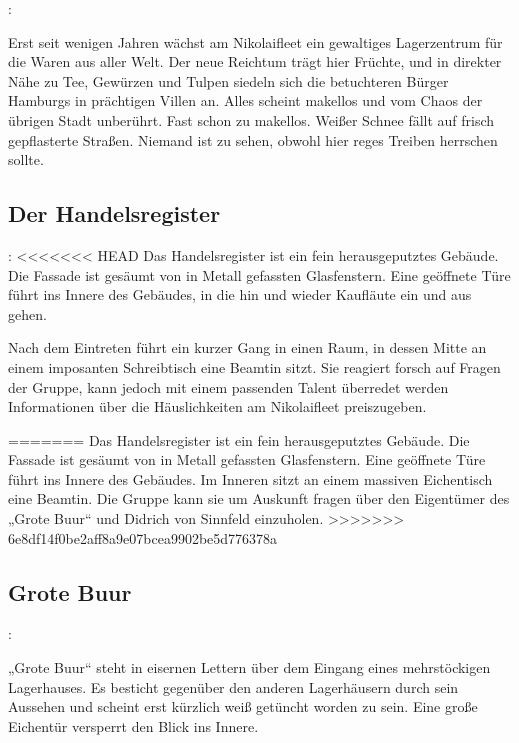 :

Erst seit wenigen Jahren wächst am Nikolaifleet ein gewaltiges Lagerzentrum für die Waren aus aller Welt. Der neue Reichtum trägt hier Früchte, und in direkter Nähe zu Tee, Gewürzen und Tulpen siedeln sich die betuchteren Bürger Hamburgs in prächtigen Villen an. Alles scheint makellos und vom Chaos der übrigen Stadt unberührt. Fast schon zu makellos. Weißer Schnee fällt auf frisch gepflasterte Straßen. Niemand ist zu sehen, obwohl hier reges Treiben herrschen sollte.

\subsection{Der Handelsregister}
\label{handelsregister}

:
<<<<<<< HEAD
Das Handelsregister ist ein fein herausgeputztes Gebäude. Die Fassade ist gesäumt von in Metall gefassten Glasfenstern. Eine geöffnete Türe führt ins Innere des Gebäudes, in die hin und wieder Kaufläute ein und aus gehen.

Nach dem Eintreten führt ein kurzer Gang in einen Raum, in dessen Mitte an einem imposanten Schreibtisch eine Beamtin sitzt.
Sie reagiert forsch auf Fragen der Gruppe, kann jedoch mit einem passenden Talent überredet werden Informationen über die Häuslichkeiten am Nikolaifleet preiszugeben.

=======
Das Handelsregister ist ein fein herausgeputztes Gebäude. Die Fassade ist gesäumt von in Metall gefassten Glasfenstern. Eine geöffnete Türe führt ins Innere des Gebäudes. Im Inneren sitzt an einem
massiven Eichentisch eine Beamtin. Die Gruppe kann sie um Auskunft fragen über den Eigentümer des „Grote Buur“ und Didrich von Sinnfeld einzuholen.
>>>>>>> 6e8df14f0be2aff8a9e07bcea9902be5d776378a

\subsection*{Grote Buur}
\label{"grote buur"}

:

„Grote Buur“ steht in eisernen Lettern über dem Eingang eines mehrstöckigen Lagerhauses. Es besticht gegenüber den anderen Lagerhäusern durch sein Aussehen und scheint erst kürzlich weiß getüncht worden zu sein. Eine große Eichentür versperrt den Blick ins Innere.

